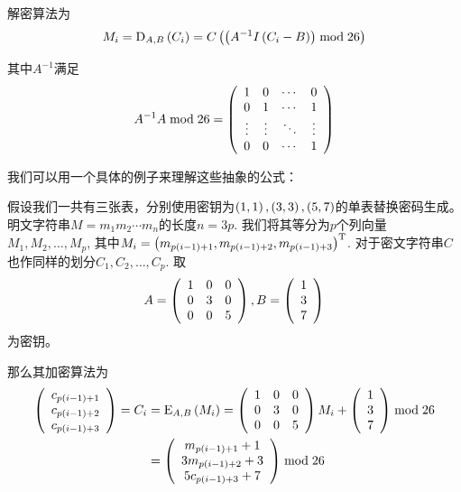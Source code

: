 解密算法为
\begin{equation}
    M_i={\mathrm{D}_{A, B}\left({C_i}\right)}=C\left( {\left( {A^{-1}I\left( {C_i-B}\right)}\right)\bmod{26}}\right)
\end{equation}

其中$A^{-1}$满足
\[A^{-1}A\bmod{26}=\left( {\begin{array}{cccc}1&0&\cdots &0\\0&1&\cdots&1\\\vdots&\vdots&\ddots &\vdots\\0&0&\cdots&1\end{array}}\right)\]

我们可以用一个具体的例子来理解这些抽象的公式：\par
假设我们一共有三张表，分别使用密钥为$\left( {1, 1}\right), \left( {3, 3}\right), \left( {5, 7}\right)$的单表替换密码生成。明文字符串$M=m_1m_2\cdots m_n$的长度$n=3p$. 我们将其等分为$p$个列向量$M_1, M_2, \ldots, M_p$, 其中$M_i=\left( {m_{p(i-1)+1}, m_{p(i-1)+2}, m_{p(i-1)+3}}\right)^{\mathrm{T}}$. 对于密文字符串$C$也作同样的划分$C_1, C_2, \ldots, C_p$. 取
\[A=\left( {\begin{array}{ccc}1&0&0\\0&3&0\\0&0&5\end{array}}\right), B=\left( {\begin{array}{c}1\\3\\7\end{array}}\right)\]
为密钥。\par
那么其加密算法为
\begin{align*}
    \left( {\begin{array}{c}c_{p(i-1)+1}\\c_{p(i-1)+2}\\c_{p(i-1)+3}\end{array}}\right)=C_i&={\mathrm{E}_{A, B}\left({M_i}\right)}=\left( {\begin{array}{ccc}1&0&0\\0&3&0\\0&0&5\end{array}}\right)M_i+\left( {\begin{array}{c}1\\3\\7\end{array}}\right)\bmod{26}\\
    &=\left( {\begin{array}{c}m_{p(i-1)+1}+1\\3m_{p(i-1)+2}+3\\5c_{p(i-1)+3}+7\end{array}}\right)\bmod{26}
\end{align*}

